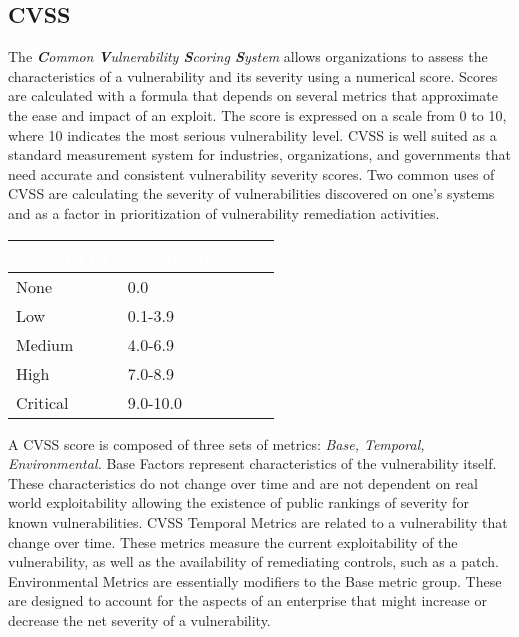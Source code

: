\subsection{CVSS}
The \textit{\textbf{C}ommon \textbf{V}ulnerability \textbf{S}coring \textbf{S}ystem} allows organizations to assess the characteristics of a vulnerability and its severity using a numerical score. Scores are calculated with a formula that depends on several metrics that approximate the ease and impact of an exploit. The score is expressed on a scale from 0 to 10, where 10 indicates the most serious vulnerability level. CVSS is well suited as a standard measurement system for industries, organizations, and governments that need accurate and consistent vulnerability severity scores. Two common uses of CVSS are calculating the severity of vulnerabilities discovered on one's systems and as a factor in prioritization of vulnerability remediation activities.
\begin{table}[H]
\centering
\begin{tabular}{|l|l|} 
\hline
\rowcolor{dummy-cyan} \textbf{\textcolor{white}{SEVERITY}} & \textbf{\textcolor{white}{SCORE RANGE}}  \\ 
\hline
None                                                 & \textcolor[rgb]{0.2,0.2,0.2}{0.0}             \\ 
\hline
Low                                                  & \textcolor[rgb]{0.2,0.2,0.2}{0.1-3.9}         \\ 
\hline
Medium                                               & \textcolor[rgb]{0.2,0.2,0.2}{4.0-6.9}         \\ 
\hline
High                                                 & 7.0-8.9                                       \\ 
\hline
Critical                                             & \textcolor[rgb]{0.2,0.2,0.2}{9.0-10.0}        \\
\hline
\end{tabular}
\end{table}\noindent
A CVSS score is composed of three sets of metrics: \textit{Base, Temporal, Environmental.} Base Factors represent characteristics of the vulnerability itself. These characteristics do not change over time and are not dependent on real world exploitability allowing the existence of public rankings of severity for known vulnerabilities. CVSS Temporal Metrics are related to a vulnerability that change over time. These metrics measure the current exploitability of the vulnerability, as well as the availability of remediating controls, such as a patch. Environmental Metrics are essentially modifiers to the Base metric group. These are designed to account for the aspects of an enterprise that might increase or decrease the net severity of a vulnerability. 
